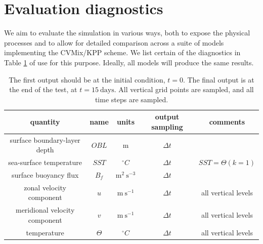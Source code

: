 \section{Evaluation diagnostics}

We aim to evaluate the simulation in various ways, both to expose the
physical processes and to allow for detailed comparison across a suite
of models implementing the CVMix/KPP scheme.  We list certain of the
diagnostics in Table \ref{table:metricsShear} of use for this purpose.
Ideally, all models will produce the same results.

\begin{table}[htdp]
\begin{center}
\begin{tabular}{|c|c|c|c|c|}
\hline
{\sc quantity}                                 & {\sc name}        & {\sc units}                              & {\sc output sampling}     & {\sc comments} \\
\hline
surface boundary-layer depth          & $OBL$              & $\mbox{m}$                            & $\Delta t$                       &  \\
\hline 
sea-surface temperature                 & $SST$               & $^{\circ}C$                                & $\Delta t$                       & $SST=\Theta(k=1)$\\
\hline 
surface buoyancy flux                     & $B_{f}$              & $\mbox{m}^2~\mbox{s}^{-3}$   &$\Delta t$                        & \\
\hline 
zonal velocity component               & $u$                   & $\mbox{m}~\mbox{s}^{-1}$       &  $\Delta t$  &  all vertical levels \\
\hline 
meridional velocity component       & $v$                    & $\mbox{m}~\mbox{s}^{-1}$       &  $\Delta t$  &  all vertical levels \\
\hline
temperature                                    & $\Theta$         & $^{\circ}C$                                  &  $\Delta t$  &  all vertical levels \\
\hline
\end{tabular}
\end{center}
\caption{The first output should be at the initial condition, $t=0$. The final 
  output is at the end of the test, at $t=15~\mbox{days}$.  
  All vertical grid points are sampled, and all time steps are sampled.}
\label{table:metricsShear}
\end{table}


